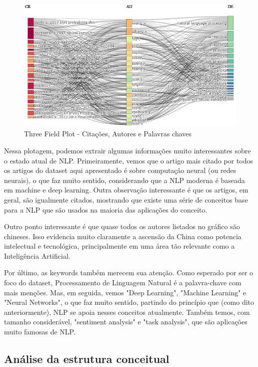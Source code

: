 \begin{figure}
    \centering
    \includegraphics[width=1\textwidth]{experiments/ABMHub/PesquisaBibliometrica/NLP/tfp1.png}
    \caption{Three Field Plot - Citações, Autores e Palavras chaves}
    \label{fig:ABMHub:TFP1}
\end{figure}

Nessa plotagem, podemos extrair algumas informações muito interessantes sobre o estado atual de NLP. Primeiramente, vemos que o artigo mais citado por todos os artigos do dataset aqui apresentado é sobre computação neural (ou redes neurais), o que faz muito sentido, considerando que a NLP moderna é baseada em machine e deep learning. Outra observação interessante é que os artigos, em geral, são igualmente citados, mostrando que existe uma série de conceitos base para a NLP que são usados na maioria das aplicações do conceito.

Outro ponto interessante é que quase todos os autores listados no gráfico são chineses. Isso evidencia muito claramente a ascensão da China como potencia intelectual e tecnológica, principalmente em uma área tão relevante como a Inteligência Artificial.

Por último, as keywords também merecem sua atenção. Como esperado por ser o foco do dataset, Processamento de Linguagem Natural é a palavra-chave com mais menções. Mas, em seguida, vemos "Deep Learning", "Machine Learning" e "Neural Networks", o que faz muito sentido, partindo do princípio que (como dito anteriormente), NLP se apoia nesses conceitos atualmente. Também temos, com tamanho considerável, "sentiment analysis" e "task analysis", que são aplicações muito famosas de NLP.

\subsection{Análise da estrutura conceitual}

